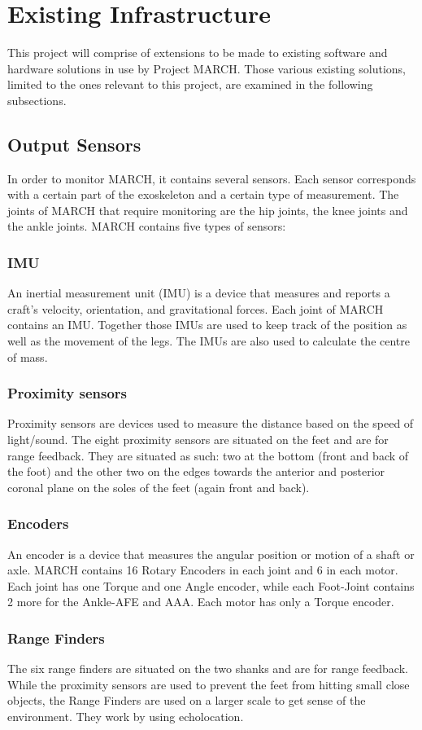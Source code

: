 \section{Existing Infrastructure}\label{sec:infra}
This project will comprise of extensions to be made to existing software and hardware solutions in use by Project MARCH. Those various existing solutions, limited to the ones relevant to this project, are examined in the following subsections.
\subsection{Output Sensors}
In order to monitor MARCH, it contains several sensors. Each sensor corresponds with a certain part of the exoskeleton and a certain type of measurement. The joints of MARCH that require monitoring are the hip joints, the knee joints and the ankle joints. MARCH contains five types of sensors:
\subsubsection{IMU}
An inertial measurement unit (IMU) is a device that measures and reports a craft's velocity, orientation, and gravitational forces. Each joint of MARCH contains an IMU. Together those IMUs are used to keep track of the position as well as the movement of the legs. The IMUs are also used to calculate the centre of mass. 
\subsubsection{Proximity sensors}
Proximity sensors are devices used to measure the distance based on the speed of light/sound. The eight proximity sensors are situated on the feet and are for range feedback. They are situated as such: two at the bottom (front and back of the foot) and the other two on the edges towards the anterior and posterior coronal plane on the soles of the feet (again front and back). 
\subsubsection{Encoders}
An encoder is a device that measures the angular position or motion of a shaft or axle. MARCH contains 16 Rotary Encoders in each joint and 6 in each motor. Each joint has one Torque and one Angle encoder, while each Foot-Joint contains 2 more for the Ankle-AFE and AAA. Each motor has only a Torque encoder.
\subsubsection{Range Finders}
The six range finders are situated on the two shanks and are for range feedback. While the proximity sensors are used to prevent the feet from hitting small close objects, the Range Finders are used on a larger scale to get sense of the environment. They work by using echolocation.
